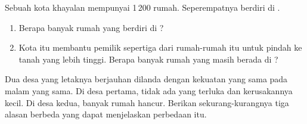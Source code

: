 \begin{exercise}[$\star\star$]\label{exo:g5:natural-hazards:10}
Sebuah kota khayalan mempunyai 1\,200 rumah. Seperempatnya berdiri di
 .
\begin{enumerate}
  \item[(a)] Berapa banyak rumah yang berdiri di ?
  \item[(b)] Kota itu membantu pemilik sepertiga dari rumah-rumah itu untuk
        pindah ke tanah yang lebih tinggi. Berapa banyak rumah yang masih
        berada di ?
\end{enumerate}
\end{exercise}

\begin{exercise}[$\star\star\star$]\label{exo:g5:natural-hazards:11}
Dua desa yang letaknya berjauhan dilanda  dengan kekuatan yang sama
pada malam yang sama. Di desa pertama, tidak ada yang terluka dan
kerusakannya kecil. Di desa kedua, banyak rumah hancur. Berikan
sekurang-kurangnya tiga alasan berbeda yang dapat menjelaskan perbedaan itu.
\end{exercise}

